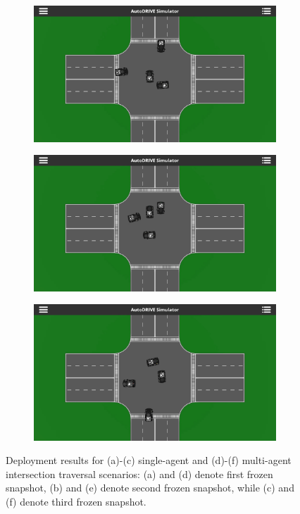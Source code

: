 \documentclass[letterpaper, 10 pt, conference]{ieeeconf}  %
\begin{document}
\begin{figure}[t]
\begin{subfigure}[b]{0.16\linewidth}
			\caption{}
			\label{fig6c}
		\end{subfigure}
		\hfill
		\begin{subfigure}[b]{0.16\linewidth}
			\centering
			\includegraphics[width=\linewidth]{Fig6d.png}
			\caption{}
			\label{fig6d}
		\end{subfigure}
		\hfill
		\begin{subfigure}[b]{0.16\linewidth}
			\centering
			\includegraphics[width=\linewidth]{Fig6e.png}
			\caption{}
			\label{fig6e}
		\end{subfigure}
		\hfill
		\begin{subfigure}[b]{0.16\linewidth}
			\centering
			\includegraphics[width=\linewidth]{Fig6f.png}
			\caption{}
			\label{fig6f}
		\end{subfigure}
		\caption{Deployment results for (a)-(c) single-agent and (d)-(f) multi-agent intersection traversal scenarios: (a) and (d) denote first frozen snapshot, (b) and (e) denote second frozen snapshot, while (c) and (f) denote third frozen snapshot.}
		\label{fig6}
	\end{figure}
	
\end{document}

